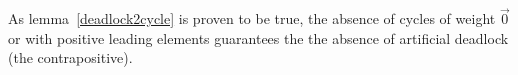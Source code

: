As lemma~\ref{deadlock2cycle} is proven to be true, the absence of cycles of
weight $\vec{0}$ or with positive leading elements guarantees the the absence of artificial deadlock (the contrapositive).

